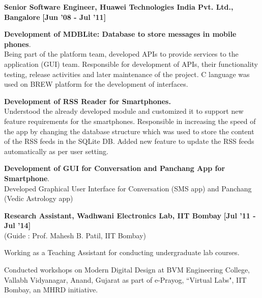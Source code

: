 \documentclass[a4paper,10pt]{article}
\begin{document}
\begin{itemize*}
  \setlength{\itemsep}{.00pt}
  \item \textbf{{Senior Software Engineer, Huawei Technologies India Pvt. Ltd., Bangalore}} \hfill {\small{{\textbf{[Jun '08 - Jul '11]}}\/}}
  \begin{itemize*}
    \item \textbf{Development of MDBLite: Database to store messages in mobile phones}.\\
    Being part of the platform team, developed APIs to provide services to the application (GUI) team. Responsible for development of APIs, their functionality testing, release activities and later maintenance of the project. C language was used on BREW platform for the development of interfaces.
  \end{itemize*}
  \begin{itemize*}
    \item \textbf{Development of RSS Reader for Smartphones.}\\
    Understood the already developed module and customized it to support new feature requirements for the smartphones. Responsible in increasing the speed of the app by changing the database structure which was used to store the content of the RSS feeds in the SQLite DB. Added new feature to update the RSS feeds automatically as per user setting.
  \end{itemize*}
  \begin{itemize*}
    \item \textbf{Development of GUI for Conversation and Panchang App for Smartphone}.\\
    Developed Graphical User Interface for Conversation (SMS app) and Panchang (Vedic Astrology app)
  \end{itemize*}
\end{itemize*}

\begin{itemize*}
  \setlength{\itemsep}{.00pt}
  \item \textbf{{Research Assistant, Wadhwani Electronics Lab, IIT Bombay}} \hfill {\small{{\textbf{[Jul '11 - Jul '14]}}\/}} \\
  {(Guide : Prof. Mahesh B. Patil, IIT Bombay)}
  \begin{itemize*}
    \item Working as a Teaching Assistant for conducting undergraduate lab courses.
  \end{itemize*}
  \begin{itemize*}
    \item Conducted workshops on Modern Digital Design at BVM Engineering College, Vallabh Vidyanagar, Anand, Gujarat as part of e-Prayog, ``Virtual Labs", IIT Bombay, an MHRD initiative.
  \end{itemize*}
\end{itemize*}
\end{document}
